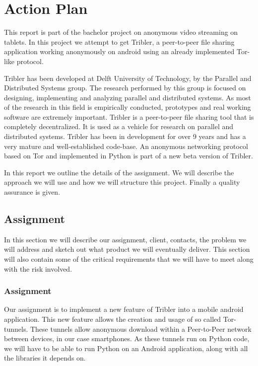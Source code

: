 \chapter{Action Plan}

This report is part of the bachelor project on anonymous video streaming on tablets. In this project we attempt to get Tribler, a peer-to-peer file sharing application working anonymously on android using an already implemented Tor-like protocol.

Tribler has been developed at Delft University of Technology, by the Parallel and Distributed Systems group. The research performed by this group is focused on designing, implementing and analyzing parallel and distributed systems. As most of the research in this field is empirically conducted, prototypes and real working software are extremely important. Tribler is a peer-to-peer file sharing tool that is completely decentralized. It is used as a vehicle for research on parallel and distributed systems. Tribler has been in development for over 9 years and has a very mature and well-established code-base. An anonymous networking protocol based on Tor and implemented in Python is part of a new beta version of Tribler.

In this report we outline the details of the assignment. We will describe the approach we will use and how we will structure this project. Finally a quality assurance is given.

\section{Assignment}
In this section we will describe our assignment, client, contacts, the problem we will address and sketch out what product we will eventually deliver. This section will also contain some of the critical requirements that we will have to meet along with the risk involved.

\subsection{Assignment}
Our assignment is to implement a new feature of Tribler into a mobile android application. This new feature allows the creation and usage of so called Tor-tunnels. These tunnels allow anonymous download within a Peer-to-Peer network between devices, in our case smartphones.
As these tunnels run on Python code, we will have to be able to run Python on an Android application, along with all the libraries it depends on.

